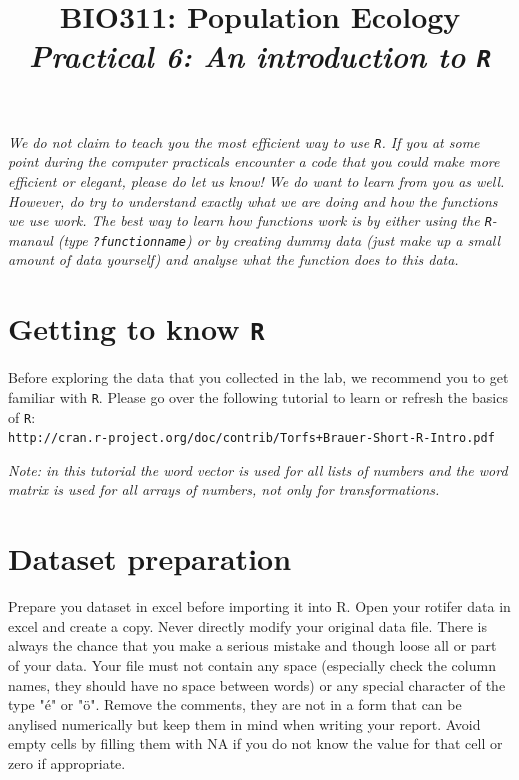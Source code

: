 \documentclass{article}\usepackage[]{graphicx}\usepackage[]{color}
\title{BIO311: Population Ecology\\ \textit{Practical 6: An introduction to \texttt{R}}}
\begin{document}



\maketitle
\tableofcontents
\vspace{3cm}
\begin{mdframed}
\textit{We do not claim to teach you the most efficient way to use \texttt{R}. If you at some point during the computer practicals encounter a code that you could make more efficient or elegant, please do let us know! We do want to learn from you as well.\\[1.5ex] However, do try to understand exactly what we are doing and how the functions we use work. The best way to learn how functions work is by either using the \texttt{R}-manaul (type \texttt{?functionname}) or by creating dummy data (just make up a small amount of data yourself) and analyse what the function does to this data.}
\end{mdframed}
\newpage
\section{Getting to know \texttt{R}}
Before exploring the data that you collected in the lab, we recommend you to get familiar with \texttt{R}. Please go over the following tutorial to learn or refresh the basics of \texttt{R}:\\

\texttt{http://cran.r-project.org/doc/contrib/Torfs+Brauer-Short-R-Intro.pdf}
\vspace{1.5ex}

\textit{Note: in this tutorial the word vector is used for all lists of numbers and the word matrix is used for all arrays of numbers, not only for transformations.}

\section{Dataset preparation}
Prepare you dataset in excel before importing it into R. Open your rotifer data in excel and create a copy. Never directly modify your original data file. There is always the chance that you make a serious mistake and though loose all or part of your data. Your file must not contain any space (especially check the column names, they should have no space between words) or any special character of the type "\'e" or "\"o". Remove the comments, they are not in a form that can be anylised numerically but keep them in mind when writing your report. Avoid empty cells by filling them with NA if you do not know the value for that cell or zero if appropriate. 
\end{document}
